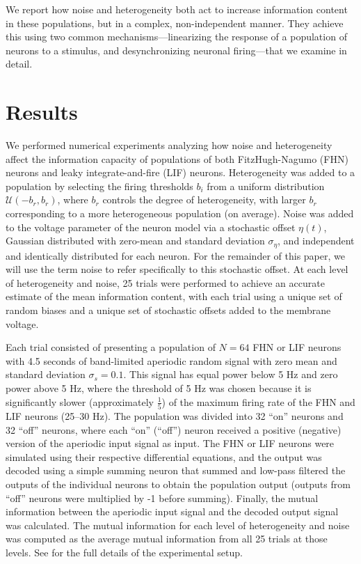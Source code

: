 \documentclass[12pt]{article}
\begin{document}
We report how noise and heterogeneity both act to increase information content in these populations, but in a complex, non-independent manner. They achieve this using two common mechanisms---linearizing the response of a population of neurons to a stimulus, and desynchronizing neuronal firing---that we examine in detail.

\section{Results}
\label{scn:results}

We performed numerical experiments analyzing how noise and heterogeneity affect the information capacity of populations of both FitzHugh-Nagumo (FHN) neurons and leaky integrate-and-fire (LIF) neurons. Heterogeneity was added to a population by selecting the firing thresholds ${b_i}$ from a uniform distribution $\mathcal{U}(-b_r, b_r)$, where $b_r$ controls the degree of heterogeneity, with larger $b_r$ corresponding to a more heterogeneous population (on average). Noise was added to the voltage parameter of the neuron model via a stochastic offset $\eta(t)$, Gaussian distributed with zero-mean and standard deviation $\sigma_\eta$, and independent and identically distributed for each neuron. For the remainder of this paper, we will use the term noise to refer specifically to this stochastic offset. At each level of heterogeneity and noise, 25 trials were performed to achieve an accurate estimate of the mean information content, with each trial using a unique set of random biases and a unique set of stochastic offsets added to the membrane voltage.

Each trial consisted of presenting a population of $N = 64$ FHN or LIF neurons with 4.5 seconds of band-limited aperiodic random signal with zero mean and standard deviation $\sigma_s = 0.1$. This signal has equal power below 5 Hz and zero power above 5 Hz, where the threshold of 5 Hz was chosen because it is significantly slower (approximately $\frac{1}{5}$) of the maximum firing rate of the FHN and LIF neurons (25--30 Hz). The population was divided into 32 ``on'' neurons and 32 ``off'' neurons, where each ``on'' (``off'') neuron received a positive (negative) version of the aperiodic input signal as input. The FHN or LIF neurons were simulated using their respective differential equations, and the output was decoded using a simple summing neuron that summed and low-pass filtered the outputs of the individual neurons to obtain the population output (outputs from ``off'' neurons were multiplied by -1 before summing). Finally, the mutual information between the aperiodic input signal and the decoded output signal was calculated. The mutual information for each level of heterogeneity and noise was computed as the average mutual information from all 25 trials at those levels. See \textsc{} for the full details of the experimental setup.
\end{document}
